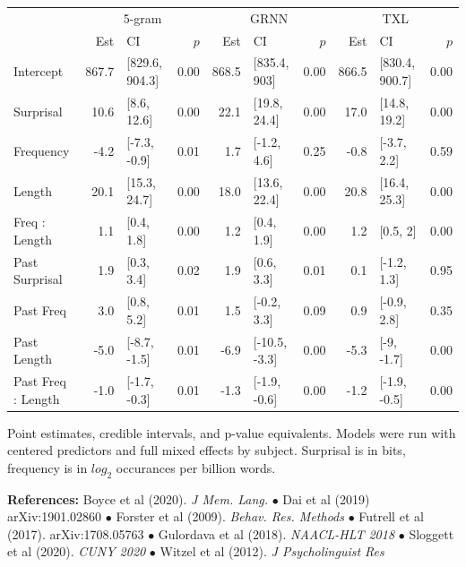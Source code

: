 \documentclass[11pt,a4paper]{article}
\begin{document}
	\setlength{\tabcolsep}{4pt}
\begin{small}%
\begin{tabular}{l|rlr|rlr|rlr}
	\hline
	&\multicolumn{3}{c|}{5-gram}&\multicolumn{3}{c|}{GRNN}&\multicolumn{3}{c}{TXL}\\
		 & Est & CI & $p$ & Est & CI & $p$ &Est & CI & $p$ \\ 
		 \hline
Intercept & 867.7 & [829.6, 904.3] & 0.00 & 868.5 & [835.4, 903] & 0.00 & 866.5 & [830.4, 900.7] & 0.00 \\
Surprisal & 10.6 & [8.6, 12.6] & 0.00 & 22.1 & [19.8, 24.4] & 0.00 & 17.0 & [14.8, 19.2] & 0.00 \\
Frequency & -4.2 & [-7.3, -0.9] & 0.01 & 1.7 & [-1.2, 4.6] & 0.25 & -0.8 & [-3.7, 2.2] & 0.59 \\ 
Length & 20.1 & [15.3, 24.7] & 0.00 & 18.0 & [13.6, 22.4] & 0.00 & 20.8 & [16.4, 25.3] & 0.00 \\ 
Freq : Length & 1.1 & [0.4, 1.8] & 0.00 & 1.2 & [0.4, 1.9] & 0.00 & 1.2 & [0.5, 2] & 0.00 \\ 
\hline
Past Surprisal & 1.9 & [0.3, 3.4] & 0.02 & 1.9 & [0.6, 3.3] & 0.01 & 0.1 & [-1.2, 1.3] & 0.95 \\ 
Past Freq & 3.0 & [0.8, 5.2] & 0.01 & 1.5 & [-0.2, 3.3] & 0.09 & 0.9 & [-0.9, 2.8] & 0.35 \\ 
Past Length & -5.0 & [-8.7, -1.5] & 0.01 & -6.9 & [-10.5, -3.3] & 0.00 & -5.3 & [-9, -1.7] & 0.00 \\ 
Past Freq : Length& -1.0 & [-1.7, -0.3] & 0.01 & -1.3 & [-1.9, -0.6] & 0.00 & -1.2 & [-1.9, -0.5] & 0.00 \\ 
\hline
\end{tabular}
\vspace{.5em}

\end{small}
		\begin{small}
			Point estimates, credible intervals, and p-value equivalents. Models were run with centered predictors and full mixed effects by subject. Surprisal is in bits, frequency is in $log_2$ occurances per billion words. 
		\end{small}
\vspace{.5em}

	\begin{small}{
			\noindent\textbf{References:}
			Boyce et al (2020). \textit{J Mem. Lang.} $\bullet$
			Dai et al (2019) arXiv:1901.02860 $\bullet$
			Forster et al (2009). \textit{Behav. Res. Methods} $\bullet$
			Futrell et al (2017). arXiv:1708.05763 $\bullet$
			Gulordava et al (2018).  \textit{NAACL-HLT 2018} $\bullet$
			Sloggett et al (2020). \textit{CUNY 2020} $\bullet$
			Witzel et al (2012).  \textit{J Psycholinguist Res} 
		}
	\end{small}
\end{document}
